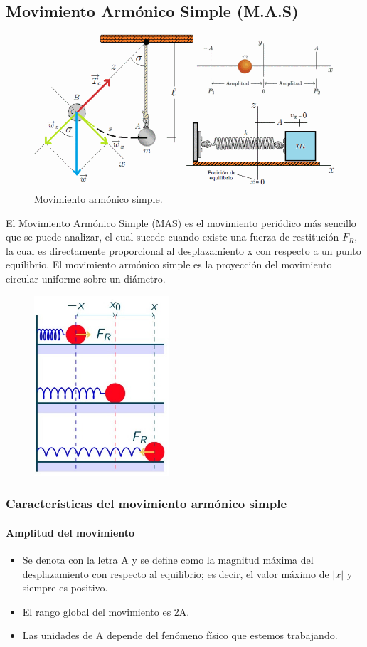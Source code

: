 \subsection{Movimiento Armónico Simple (M.A.S)}
\begin{figure}[H]
	\centering
	\includegraphics[width=12cm]{Images/fig_02}
	\caption{Movimiento armónico simple.}\label{fig:03}
\end{figure}
El Movimiento Armónico Simple (MAS) es el movimiento periódico más sencillo que se puede analizar, el cual sucede cuando existe una fuerza de restitución $F_R$, la cual es directamente proporcional al desplazamiento x con respecto a un punto equilibrio.
El movimiento armónico simple es la proyección del movimiento circular uniforme sobre un diámetro.
\begin{figure}[H]
	\centering
	\includegraphics[width=5cm]{Images/fig_i.jpeg}
\end{figure}

\subsubsection{Características del movimiento armónico simple}
\paragraph{Amplitud del movimiento}
\begin{itemize}[label=\textbf{$\bullet$},itemsep=2pt,partopsep=6pt,parsep=6pt]
	\item Se denota con la letra A y se define como la magnitud máxima del desplazamiento con respecto al equilibrio; es decir, el valor máximo de $|x|$ y siempre es positivo.
	\item El rango global del movimiento es 2A.
	\item Las unidades de A depende del fenómeno físico que estemos trabajando.
\end{itemize}
